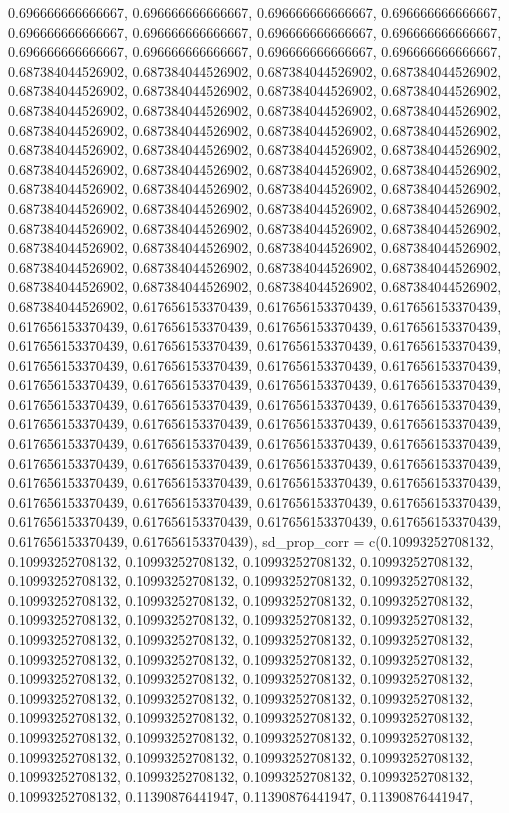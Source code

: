 \documentclass[
  man,floatsintext]{apa6}
\begin{document}
0.696666666666667, 0.696666666666667, 0.696666666666667, 0.696666666666667, 0.696666666666667, 0.696666666666667, 0.696666666666667, 0.696666666666667, 0.696666666666667, 0.696666666666667, 0.696666666666667, 0.696666666666667, 0.687384044526902, 0.687384044526902, 0.687384044526902, 0.687384044526902, 0.687384044526902, 0.687384044526902, 0.687384044526902, 0.687384044526902, 0.687384044526902, 0.687384044526902, 0.687384044526902, 0.687384044526902, 0.687384044526902, 0.687384044526902, 0.687384044526902,
0.687384044526902, 0.687384044526902, 0.687384044526902, 0.687384044526902, 0.687384044526902, 0.687384044526902, 0.687384044526902, 0.687384044526902, 0.687384044526902, 0.687384044526902, 0.687384044526902, 0.687384044526902, 0.687384044526902, 0.687384044526902, 0.687384044526902, 0.687384044526902, 0.687384044526902, 0.687384044526902, 0.687384044526902, 0.687384044526902, 0.687384044526902, 0.687384044526902, 0.687384044526902, 0.687384044526902, 0.687384044526902, 0.687384044526902, 0.687384044526902,
0.687384044526902, 0.687384044526902, 0.687384044526902, 0.687384044526902, 0.687384044526902, 0.687384044526902, 0.687384044526902, 0.617656153370439, 0.617656153370439, 0.617656153370439, 0.617656153370439, 0.617656153370439, 0.617656153370439, 0.617656153370439, 0.617656153370439, 0.617656153370439, 0.617656153370439, 0.617656153370439, 0.617656153370439, 0.617656153370439, 0.617656153370439, 0.617656153370439, 0.617656153370439, 0.617656153370439, 0.617656153370439, 0.617656153370439, 0.617656153370439,
0.617656153370439, 0.617656153370439, 0.617656153370439, 0.617656153370439, 0.617656153370439, 0.617656153370439, 0.617656153370439, 0.617656153370439, 0.617656153370439, 0.617656153370439, 0.617656153370439, 0.617656153370439, 0.617656153370439, 0.617656153370439, 0.617656153370439, 0.617656153370439, 0.617656153370439, 0.617656153370439, 0.617656153370439, 0.617656153370439, 0.617656153370439, 0.617656153370439, 0.617656153370439, 0.617656153370439, 0.617656153370439, 0.617656153370439, 0.617656153370439,
0.617656153370439, 0.617656153370439), sd\_prop\_corr = c(0.10993252708132, 0.10993252708132, 0.10993252708132, 0.10993252708132, 0.10993252708132, 0.10993252708132, 0.10993252708132, 0.10993252708132, 0.10993252708132, 0.10993252708132, 0.10993252708132, 0.10993252708132, 0.10993252708132, 0.10993252708132, 0.10993252708132, 0.10993252708132, 0.10993252708132, 0.10993252708132, 0.10993252708132, 0.10993252708132, 0.10993252708132, 0.10993252708132, 0.10993252708132, 0.10993252708132, 0.10993252708132,
0.10993252708132, 0.10993252708132, 0.10993252708132, 0.10993252708132, 0.10993252708132, 0.10993252708132, 0.10993252708132, 0.10993252708132, 0.10993252708132, 0.10993252708132, 0.10993252708132, 0.10993252708132, 0.10993252708132, 0.10993252708132, 0.10993252708132, 0.10993252708132, 0.10993252708132, 0.10993252708132, 0.10993252708132, 0.10993252708132, 0.10993252708132, 0.10993252708132, 0.10993252708132, 0.10993252708132, 0.10993252708132, 0.11390876441947, 0.11390876441947, 0.11390876441947,
\end{document}
